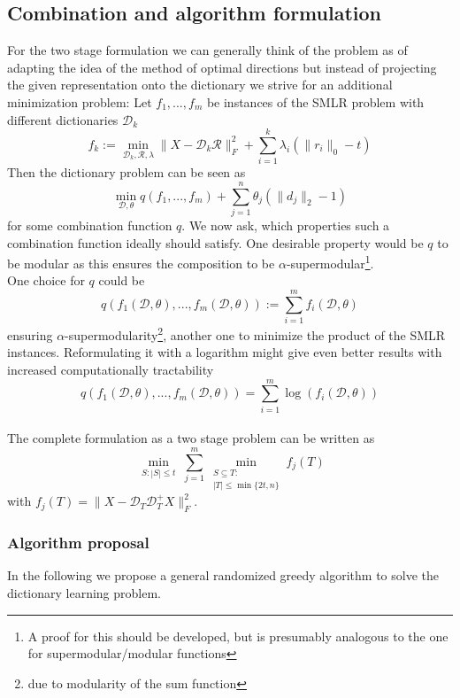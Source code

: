 \documentclass{article}
\newcommand{\Rr}{\mathcal{R}}
\newcommand{\D}{\mathcal{D}}
\begin{document}
\subsection{Combination and algorithm formulation}
For the two stage formulation we can generally think of the problem as of adapting the idea of the method of optimal directions but instead of projecting the given representation onto the dictionary we strive for an additional minimization problem:
Let $f_1, ..., f_m$ be instances of the SMLR problem with different dictionaries $\D_k$
\[
f_k := \min_{\D_k, \Rr, \lambda} \|X  -\D_k \Rr\|_F^2 + \sum_{i=1}^k \lambda_i (\| r_i \|_0 - t)
\]
 Then the dictionary problem can be seen as
\[
\min_{\D, \theta} q(f_1, ..., f_m) + \sum_{j=1}^n \theta_j (\| d_j\|_2 - 1)
\]
for some combination function $q$. We now ask, which properties such a combination function ideally should satisfy. One desirable property would be $q$ to be modular as this ensures the composition to be $\alpha$-supermodular\footnote{A proof for this should be developed, but is presumably analogous to the one for supermodular/modular functions}.
 \ \\
 One choice for $q$ could be 
 \[q(f_1(\D, \theta), ..., f_m(\D, \theta)) := \sum_{i=1}^m f_i(\D, \theta)\]
ensuring $\alpha$-supermodularity\footnote{due to modularity of the sum function}, another one to minimize the product of the SMLR instances. Reformulating it with a logarithm might give even better results with increased computationally tractability 
 \[
 q(f_1(\D, \theta), ..., f_m(\D, \theta)) = \sum_{i=1}^m \log (f_i(\D, \theta))
 \]
 \\
 The complete formulation as a two stage problem can be written as 
 \[
 \min_{\substack{S : |S| \leq t}} \sum_{j=1}^m \min_{\substack{S \subseteq T:\\ |T| \leq \min \lbrace 2t, n \rbrace}}f_j(T)
 \]
 with $f_j(T) = \|X  -\D_T\D_T^+ X\|_F^2$.
 \subsubsection*{Algorithm proposal}
 In the following we propose a general randomized greedy algorithm to solve the dictionary learning problem.
 
\end{document}
